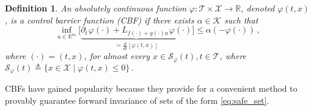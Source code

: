 \documentclass[10pt,conference]{ieeeconf}
\renewcommand{\(}{\left(}
\renewcommand{\)}{\right)}
\renewcommand{\[}{\left[}
\renewcommand{\]}{\right]}
\newcommand{\reals}{\mathbb{R}}
\newtheorem{definition}{Definition}
\newcommand{\extendedversion}[1]{{\color{black}#1}}
\begin{document}
\begin{definition}%
\label{def:cbf}
An absolutely continuous function ${\varphi} : \mathcal{T} \times\mathcal{X} \rightarrow \reals$, denoted ${\varphi}(t,x)$, %
is a \emph{control barrier function (CBF)} 
if there exists $\alpha \in \mathcal{K}$ such that
\begin{equation}
    \inf_{u\in\reals^m} \big[ \underbrace{\partial_t {\hspace{1pt}\varphi}( \cdot ) + L_{f(\cdot) + g(\cdot) u} {\hspace{1pt}\varphi}( \cdot )}_{=\frac{d}{dt}[{\varphi}(t,x)]} \big] \leq \alpha(-{\varphi}(\cdot)) \,, \label{eq:cbf_definition}
\end{equation}
where $(\cdot) = (t,x)$, for almost every $x \in \mathcal{S}_\varphi(t), t \in \mathcal{T}${,
where}
    ${\mathcal{S}_\varphi(t)\triangleq\{x\in\mathcal{X}\mid{\varphi}(t,x)\leq 0 \} \,.}$ %
\end{definition}

\extendedversion{CBFs have gained popularity because they provide for a convenient method to provably guarantee forward invariance of sets of the form \eqref{eq:safe_set}.}
\end{document}
